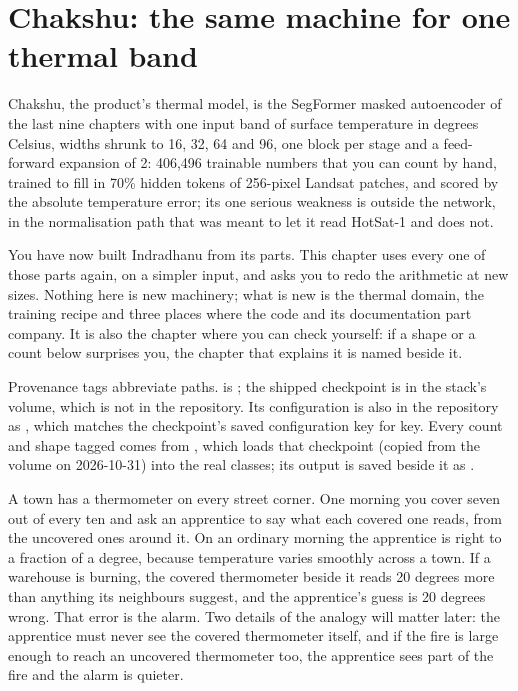 \chapter{Chakshu: the same machine for one thermal band}\label{ch:chakshu}

\begin{onething}
Chakshu, the product's thermal model, is the SegFormer masked autoencoder of the last nine chapters with one
input band of surface temperature in degrees Celsius, widths shrunk to 16, 32, 64 and 96, one block per stage and a
feed-forward expansion of 2: 406,496 trainable numbers that you can count by hand, trained to fill in 70\% hidden
tokens of 256-pixel Landsat patches, and scored by the absolute temperature error; its one serious weakness is
outside the network, in the normalisation path that was meant to let it read HotSat-1 and does not.
\end{onething}

You have now built Indradhanu from its parts. This chapter uses every one of those parts again, on a simpler input,
and asks you to redo the arithmetic at new sizes. Nothing here is new machinery; what is new is the thermal domain,
the training recipe and three places where the code and its documentation part company. It is also the chapter
where you can check yourself: if a shape or a count below surprises you, the chapter that explains it is named
beside it.

Provenance tags abbreviate paths.  is ; the shipped
checkpoint is  in the stack's  volume, which is
not in the repository. Its configuration is also in the repository as , which
matches the checkpoint's saved configuration key for key. Every count and shape tagged \tagC{} comes from
, which loads that checkpoint (copied from the volume on 2026-10-31)
into the real classes; its output is saved beside it as .

\begin{analogy}
A town has a thermometer on every street corner. One morning you cover seven out of every ten and ask an
apprentice to say what each covered one reads, from the uncovered ones around it. On an ordinary morning the
apprentice is right to a fraction of a degree, because temperature varies smoothly across a town. If a warehouse is
burning, the covered thermometer beside it reads 20 degrees more than anything its neighbours suggest, and the
apprentice's guess is 20 degrees wrong. That error is the alarm. Two details of the analogy will matter later: the
apprentice must never see the covered thermometer itself, and if the fire is large enough to reach an uncovered
thermometer too, the apprentice sees part of the fire and the alarm is quieter.
\end{analogy}

